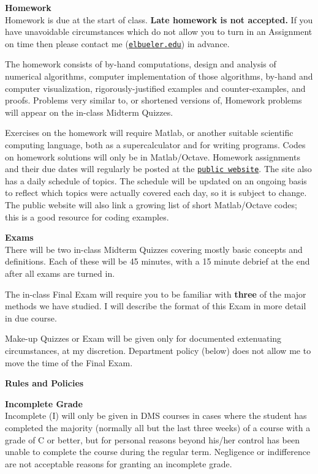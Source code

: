 \documentclass[12pt]{article}
\renewcommand{\emph}[1]{\textsf{\textbf{#1}}}
\newcommand{\localhead}[1]{\par\smallskip\textbf{#1} \smallskip\nobreak\\}%
\def\heading#1{\localhead{\large\emph{#1}}}
\def\subheading#1{\localhead{\emph{#1}}}
\begin{document}
\heading{Homework}
Homework is due at the start of class.  \emph{Late homework is not accepted.}  If you have unavoidable circumstances which do not allow you to turn in an Assignment on time then please contact me (\href{mailto:elbueler@alaska.edu}{\texttt{elbueler\@@alaska.edu}}) in advance.

The homework consists of by-hand computations, design and analysis of numerical algorithms, computer implementation of those algorithms, by-hand and computer visualization, rigorously-justified examples and counter-examples, and proofs.  Problems very similar to, or shortened versions of, Homework problems will appear on the in-class Midterm Quizzes.

Exercises on the homework will require Matlab, or another suitable scientific computing language, both as a supercalculator and for writing programs.  Codes on homework solutions will only be in Matlab/Octave.  Homework assignments and their due dates will regularly be posted at the \href{https://bueler.github.io/nla/}{\texttt{public website}}.  The site also has a daily schedule of topics.  The schedule will be updated on an ongoing basis to reflect which topics were actually covered each day, so it is subject to change.  The public website will also link a growing list of short Matlab/Octave codes; this is a good resource for coding examples.


\heading{Exams}
There will be two in-class Midterm Quizzes covering mostly basic concepts and definitions.  Each of these will be 45 minutes, with a 15 minute debrief at the end after all exams are turned in.

The in-class Final Exam will require you to be familiar with \textbf{three} of the major methods we have studied.  I will describe the format of this Exam in more detail in due course.

Make-up Quizzes or Exam will be given only for documented extenuating circumstances, at my discretion.  Department policy (below) does not allow me to move the time of the Final Exam.


\clearpage\newpage
\phantom{foo}
\heading{Rules and Policies}
\vskip -20pt

\subheading{Incomplete Grade} 
Incomplete (I) will only be given in
  DMS courses in cases where
  the student has completed the majority (normally all but the last
  three weeks) of a course with a grade of C or better, but for
  personal reasons beyond his/her control has been unable to complete
  the course during the regular term. Negligence or indifference are
  not acceptable reasons for granting an incomplete grade.
\end{document}
